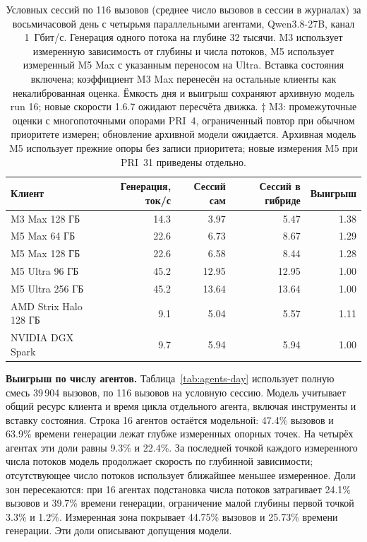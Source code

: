 \begin{table}[t]
\centering
\caption{Условных сессий по 116 вызовов (среднее число вызовов в сессии в журналах) за восьмичасовой день с четырьмя
параллельными агентами, Qwen3.8-27B, канал 1~Гбит/с.
Генерация одного потока на глубине 32 тысячи. M3 использует измеренную зависимость от глубины
и числа потоков, M5 использует измеренный M5 Max с указанным переносом на Ultra.
Вставка состояния включена; коэффициент M3 Max перенесён на остальные клиенты как некалиброванная оценка.
Ёмкость дня и выигрыш сохраняют архивную модель run 16; новые скорости 1.6.7 ожидают пересчёта движка. ‡ M3: промежуточные оценки с многопоточными опорами PRI~4, ограниченный повтор при обычном приоритете измерен; обновление архивной модели ожидается. Архивная модель M5 использует прежние опоры без записи приоритета; новые измерения M5 при PRI~31 приведены отдельно.}
\label{tab:clients}
\footnotesize
\begin{tabular}{lrrrr}
\toprule
Клиент & Генерация, ток/с & Сессий сам & Сессий в гибриде & Выигрыш \\
\midrule
M3 Max 128 ГБ & 14.3 & 3.97 & 5.47 & 1.38 \\
M5 Max 64 ГБ & 22.6 & 6.73 & 8.67 & 1.29 \\
M5 Max 128 ГБ & 22.6 & 6.58 & 8.44 & 1.28 \\
M5 Ultra 96 ГБ & 45.2 & 12.95 & 12.95 & 1.00 \\
M5 Ultra 256 ГБ & 45.2 & 13.64 & 13.64 & 1.00 \\
AMD Strix Halo 128 ГБ & 9.1 & 5.04 & 5.57 & 1.11 \\
NVIDIA DGX Spark & 9.7 & 5.94 & 5.94 & 1.00 \\
\bottomrule
\end{tabular}
\end{table}

\textbf{Выигрыш по числу агентов.} Таблица~\ref{tab:agents-day} использует полную смесь
39\,904 вызовов, по 116 вызовов на условную сессию. Модель учитывает общий ресурс клиента
и время цикла отдельного агента, включая инструменты и вставку состояния.
Строка 16 агентов остаётся модельной: 47.4\% вызовов и 63.9\% времени генерации лежат глубже измеренных опорных точек.
На четырёх агентах эти доли равны 9.3\% и 22.4\%. За последней точкой каждого измеренного числа потоков
модель продолжает скорость по глубинной зависимости; отсутствующее число потоков использует
ближайшее меньшее измеренное. Доли зон пересекаются: при 16 агентах подстановка числа потоков
затрагивает 24.1\% вызовов и 39.7\% времени генерации, ограничение малой глубины первой точкой 3.3\% и 1.2\%.
Измеренная зона покрывает 44.75\% вызовов и 25.73\% времени генерации. Эти доли описывают допущения модели.

